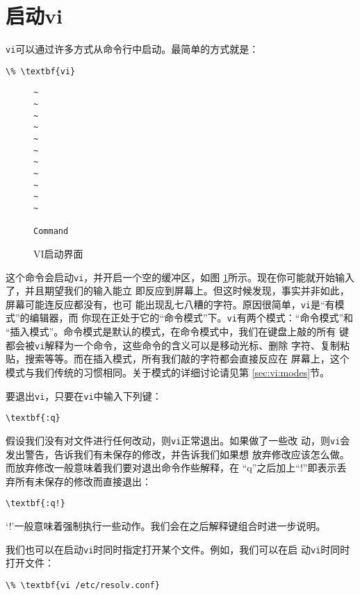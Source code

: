 \section{启动vi}
\label{sec:vi:start}
\texttt{vi}可以通过许多方式从命令行中启动。最简单的方式就是：
\begin{Verbatim}[frame=single,commandchars=\\\{\}]
\% \textbf{vi}
\end{Verbatim}
\begin{figure}[ht]
  \centering
  \begin{Verbatim}[frame=single,commandchars=\\\{\}]
~
~
~
~
~
~
~
~
~
~
~
                                                             Command
\end{Verbatim}

  \caption{VI启动界面}
  \label{fig:vi-start}
\end{figure}
这个命令会启动\texttt{vi}，并开启一个空的缓冲区，如图
\ref{fig:vi-start}所示。现在你可能就开始输入了，并且期望我们的输入能立
即反应到屏幕上。但这时候发现，事实并非如此，屏幕可能连反应都没有，也可
能出现乱七八糟的字符。原因很简单，\texttt{vi}是``有模式''的编辑器，而
你现在正处于它的``命令模式''下。\texttt{vi}有两个模式：``命令模式''和
``插入模式''。命令模式是默认的模式，在命令模式中，我们在键盘上敲的所有
键都会被\texttt{vi}解释为一个命令，这些命令的含义可以是移动光标、删除
字符、复制粘贴，搜索等等。而在插入模式，所有我们敲的字符都会直接反应在
屏幕上，这个模式与我们传统的习惯相同。关于模式的详细讨论请见第
\ref{sec:vi:modes}节。

要退出\texttt{vi}，只要在\texttt{vi}中输入下列键：
\begin{Verbatim}[frame=single,commandchars=\\\{\}]
\textbf{:q}
\end{Verbatim}
假设我们没有对文件进行任何改动，则\texttt{vi}正常退出。如果做了一些改
动，则\texttt{vi}会发出警告，告诉我们有未保存的修改，并告诉我们如果想
放弃修改应该怎么做。而放弃修改一般意味着我们要对退出命令作些解释，在
``q''之后加上``!''即表示丢弃所有未保存的修改而直接退出：
\begin{Verbatim}[frame=single,commandchars=\\\{\}]
\textbf{:q!}
\end{Verbatim}
`!'一般意味着强制执行一些动作。我们会在之后解释键组合时进一步说明。

我们也可以在启动\texttt{vi}时同时指定打开某个文件。例如，我们可以在启
动\texttt{vi}时同时打开文件：
\begin{Verbatim}[frame=single,commandchars=\\\{\}]
\% \textbf{vi /etc/resolv.conf}
\end{Verbatim}

